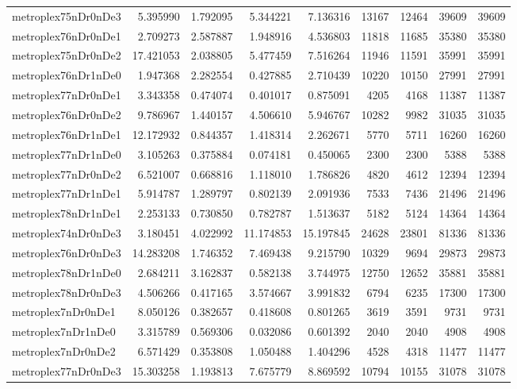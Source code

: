 \begin{longtable}{|l|r|r|r|r|r|r|r|r|}
metroplex75nDr0nDe3 & 5.395990 & 1.792095 & 5.344221 & 7.136316 & 13167 & 12464 & 39609 & 39609 \\
metroplex76nDr0nDe1 & 2.709273 & 2.587887 & 1.948916 & 4.536803 & 11818 & 11685 & 35380 & 35380 \\
metroplex75nDr0nDe2 & 17.421053 & 2.038805 & 5.477459 & 7.516264 & 11946 & 11591 & 35991 & 35991 \\
metroplex76nDr1nDe0 & 1.947368 & 2.282554 & 0.427885 & 2.710439 & 10220 & 10150 & 27991 & 27991 \\
metroplex77nDr0nDe1 & 3.343358 & 0.474074 & 0.401017 & 0.875091 & 4205 & 4168 & 11387 & 11387 \\
metroplex76nDr0nDe2 & 9.786967 & 1.440157 & 4.506610 & 5.946767 & 10282 & 9982 & 31035 & 31035 \\
metroplex76nDr1nDe1 & 12.172932 & 0.844357 & 1.418314 & 2.262671 & 5770 & 5711 & 16260 & 16260 \\
metroplex77nDr1nDe0 & 3.105263 & 0.375884 & 0.074181 & 0.450065 & 2300 & 2300 & 5388 & 5388 \\
metroplex77nDr0nDe2 & 6.521007 & 0.668816 & 1.118010 & 1.786826 & 4820 & 4612 & 12394 & 12394 \\
metroplex77nDr1nDe1 & 5.914787 & 1.289797 & 0.802139 & 2.091936 & 7533 & 7436 & 21496 & 21496 \\
metroplex78nDr1nDe1 & 2.253133 & 0.730850 & 0.782787 & 1.513637 & 5182 & 5124 & 14364 & 14364 \\
metroplex74nDr0nDe3 & 3.180451 & 4.022992 & 11.174853 & 15.197845 & 24628 & 23801 & 81336 & 81336 \\
metroplex76nDr0nDe3 & 14.283208 & 1.746352 & 7.469438 & 9.215790 & 10329 & 9694 & 29873 & 29873 \\
metroplex78nDr1nDe0 & 2.684211 & 3.162837 & 0.582138 & 3.744975 & 12750 & 12652 & 35881 & 35881 \\
metroplex78nDr0nDe3 & 4.506266 & 0.417165 & 3.574667 & 3.991832 & 6794 & 6235 & 17300 & 17300 \\
metroplex7nDr0nDe1 & 8.050126 & 0.382657 & 0.418608 & 0.801265 & 3619 & 3591 & 9731 & 9731 \\
metroplex7nDr1nDe0 & 3.315789 & 0.569306 & 0.032086 & 0.601392 & 2040 & 2040 & 4908 & 4908 \\
metroplex7nDr0nDe2 & 6.571429 & 0.353808 & 1.050488 & 1.404296 & 4528 & 4318 & 11477 & 11477 \\
metroplex77nDr0nDe3 & 15.303258 & 1.193813 & 7.675779 & 8.869592 & 10794 & 10155 & 31078 & 31078 \\

\end{longtable}

